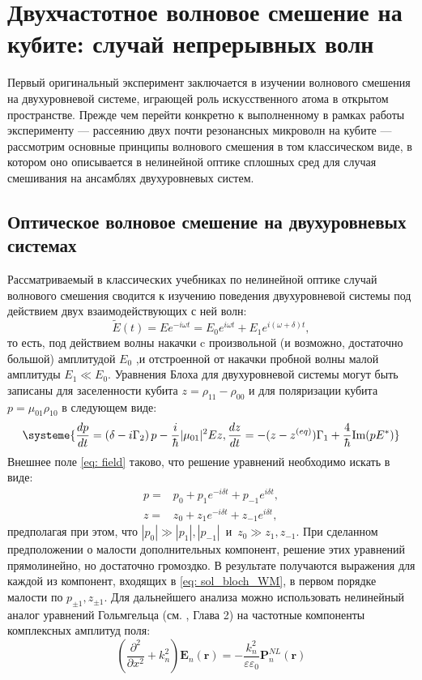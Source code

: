 \chapter{Двухчастотное волновое смешение на кубите: случай непрерывных волн}
Первый оригинальный эксперимент заключается в изучении волнового смешения на двухуровневой системе, играющей роль искусственного атома в открытом пространстве. Прежде чем перейти конкретно к выполненному в рамках работы эксперименту --- рассеянию двух почти резонансных микроволн на кубите --- рассмотрим основные принципы волнового смешения в том классическом виде, в котором оно описывается в нелинейной оптике сплошных сред для случая смешивания на ансамблях двухуровневых систем.
\section{Оптическое волновое смешение на двухуровневых системах}
Рассматриваемый в классических учебниках по нелинейной оптике случай волнового смешения сводится к изучению поведения двухуровневой системы под действием двух взаимодействующих с ней волн:
\begin{equation}
\tilde{E}(t) = Ee^{-i\omega t} = E_0e^{i\omega t} + E_1e^{i(\omega+\delta) t},
\label{eq: field}
\end{equation}
то есть, под действием волны накачки c произвольной (и возможно, достаточно большой) амплитудой $E_0$ ,и отстроенной от накачки пробной волны малой амплитуды $E_1 \ll E_0$. Уравнения Блоха для двухуровневой системы могут быть записаны для заселенности кубита $z = \rho_{11}-\rho_{00}$ и для поляризации кубита $p=\mu_{01}\rho_{10}$ в следующем виде:
\begin{equation}
\systeme{\frac{dp}{dt} = \left(\delta-i\Gamma_2\right)p -\frac{i}{\hbar}|\mu_{01}|^2Ez,
	 \frac{dz}{dt} = -(z-z^{(eq)})\Gamma_1 + \frac{4}{\hbar}\text{Im}(pE^*)}
\end{equation}
Внешнее поле \eqref{eq: field} таково, что решение уравнений необходимо искать в виде:
\begin{align}
	p =& p_0 + p_1 e^{-i\delta t} + p_{-1}e^{i\delta t}, \\
	z =& z_0 + z_1 e^{-i\delta t} + z_{-1}e^{i\delta t},
\label{eq: sol_bloch_WM}
\end{align}
предполагая при этом, что $|p_0| \gg |p_1|, |p_{-1}|$~и~$z_0 \gg z_1, z_{-1}$.  При сделанном предположении о малости дополнительных компонент, решение этих уравнений прямолинейно, но достаточно громоздко. В результате получаются выражения для каждой из компонент, входящих в \eqref{eq: sol_bloch_WM}, в первом порядке малости по $p_{\pm 1}, z_{\pm 1}$. Для дальнейшего анализа можно использовать нелинейный аналог уравнений Гольмгельца (см. \cite{boyd2003nonlinear}, Глава 2) на частотные компоненты комплексных амплитуд поля:
\begin{equation}
\left( \frac{\partial^2}{\partial x^2} + k_n^2\right) \mathbf{E}_n(\mathbf{r}) = -\frac{k_n^2}{\varepsilon\varepsilon_0}\mathbf{P}^{NL}_n(\mathbf{r})
\end{equation} 
